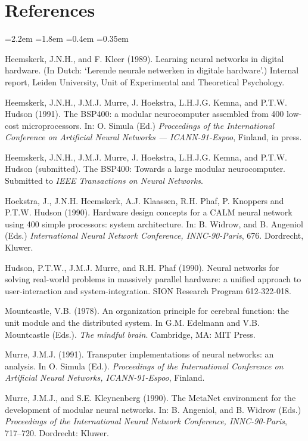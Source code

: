 \documentclass[11pt, a4paper]{article}
\begin{document}
\section*{\color{navyaccent} References}

\begin{list}{}{\leftmargin=2.2em =1.8em =0.4em \itemsep=0.35em \parsep=0pt \small}
  \item[{[1]}] Heemskerk, J.N.H., and F. Kleer (1989). Learning neural networks in digital hardware. (In Dutch: `Lerende neurale netwerken in digitale hardware'.) Internal report, Leiden University, Unit of Experimental and Theoretical Psychology.
  \item[{[2]}] Heemskerk, J.N.H., J.M.J. Murre, J. Hoekstra, L.H.J.G. Kemna, and P.T.W. Hudson (1991). The BSP400: a modular neurocomputer assembled from 400 low-cost microprocessors. In: O. Simula (Ed.) \textit{Proceedings of the International Conference on Artificial Neural Networks --- ICANN-91-Espoo}, Finland, in press.
  \item[{[3]}] Heemskerk, J.N.H., J.M.J. Murre, J. Hoekstra, L.H.J.G. Kemna, and P.T.W. Hudson (submitted). The BSP400: Towards a large modular neurocomputer. Submitted to \textit{IEEE Transactions on Neural Networks}.
  \item[{[4]}] Hoekstra, J., J.N.H. Heemskerk, A.J. Klaassen, R.H. Phaf, P. Knoppers and P.T.W. Hudson (1990). Hardware design concepts for a CALM neural network using 400 simple processors: system architecture. In: B. Widrow, and B. Angeniol (Eds.) \textit{International Neural Network Conference, INNC-90-Paris}, 676. Dordrecht, Kluwer.
  \item[{[5]}] Hudson, P.T.W., J.M.J. Murre, and R.H. Phaf (1990). Neural networks for solving real-world problems in massively parallel hardware: a unified approach to user-interaction and system-integration. SION Research Program 612-322-018.
  \item[{[6]}] Mountcastle, V.B. (1978). An organization principle for cerebral function: the unit module and the distributed system. In G.M. Edelmann and V.B. Mountcastle (Eds.). \textit{The mindful brain}. Cambridge, MA: MIT Press.
  \item[{[7]}] Murre, J.M.J. (1991). Transputer implementations of neural networks: an analysis. In O. Simula (Ed.). \textit{Proceedings of the International Conference on Artificial Neural Networks, ICANN-91-Espoo}, Finland.
  \item[{[8]}] Murre, J.M.J., and S.E. Kleynenberg (1990). The MetaNet environment for the development of modular neural networks. In: B. Angeniol, and B. Widrow (Eds.) \textit{Proceedings of the International Neural Network Conference, INNC-90-Paris}, 717--720. Dordrecht: Kluwer.

\end{list}
\end{document}
